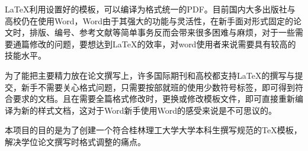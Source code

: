 
\begin{abstractcn}

LaTeX利用设置好的模板，可以编译为格式统一的PDF。目前国内大多出版社与高校仍在使用Word，Word由于其强大的功能与灵活性，在新手面对形式固定的论文时，排版、编号、参考文献等简单事务反而会带来很多困难与麻烦，对于一些需要通篇修改的问题，要想达到LaTeX的效率，对word使用者来说需要具有较高的技能水平。

为了能把主要精力放在论文撰写上，许多国际期刊和高校都支持LaTeX的撰写与提交，新手不需要关心格式问题，只需要按部就班的使用少数符号标签，即可得到符合要求的文档。且在需要全篇格式修改时，更换或修改模板文件，即可直接重新编译为新的样式文档，这对于Word新手使用Word的感受来说是不可思议的。

本项目的目的是为了创建一个符合桂林理工大学大学本科生撰写规范的TeX模板，解决学位论文撰写时格式调整的痛点。

\end{abstractcn}